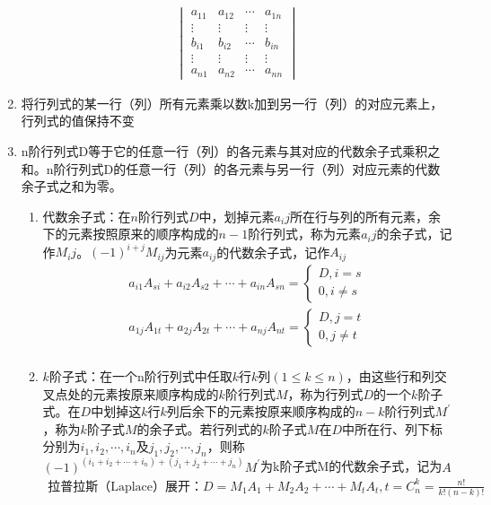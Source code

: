 \documentclass[12pt]{book}
\begin{document}
\begin{enumerate}[1.]
\begin{gather*}
\begin{vmatrix}
                  a_{11} & a_{12} & \cdots & a_{1n} \\
                  \vdots & \vdots & \vdots & \vdots \\
                  b_{i1} & b_{i2} & \cdots & b_{in} \\
                  \vdots & \vdots & \vdots & \vdots \\
                  a_{n1} & a_{n2} & \cdots & a_{nn}
              \end{vmatrix}
          \end{gather*}
    \item 将行列式的某一行（列）所有元素乘以数k加到另一行（列）的对应元素上，行列式的值保持不变
    \item n阶行列式D等于它的任意一行（列）的各元素与其对应的代数余子式乘积之和。n阶行列式D的任意一行（列）的各元素与另一行（列）对应元素的代数余子式之和为零。
    \begin{enumerate}[(1)]
        \item 代数余子式：在$n$阶行列式$D$中，划掉元素$a_ij$所在行与列的所有元素，余下的元素按照原来的顺序构成的$n-1$阶行列式，称为元素$a_ij$的余子式，记作$M_ij$。$(-1)^{i+j}M_{ij}$为元素$a_{ij}$的代数余子式，记作$A_{ij}$
        \begin{gather*}
            a_{i1}A_{si}+a_{i2}A_{s2}+\cdots+a_{in}A_{sn} = \begin{cases}
                D, i=s\\
                0, i\neq s
            \end{cases}\\
            a_{1j}A_{1t}+a_{2j}A_{2t}+\cdots+a_{nj}A_{nt} = \begin{cases}
                D, j=t\\
                0, j\neq t
            \end{cases}\\
        \end{gather*}
        \item $k$阶子式：在一个n阶行列式中任取$k$行$k$列$(1\leqslant k\leqslant n)$，由这些行和列交叉点处的元素按原来顺序构成的$k$阶行列式$M$，称为行列式$D$的一个$k$阶子式。在$D$中划掉这$k$行$k$列后余下的元素按原来顺序构成的$n-k$阶行列式$M^\prime$，称为$k$阶子式$M$的余子式。若行列式的$k$阶子式$M$在$D$中所在行、列下标分别为$i_1,i_2,\cdots,i_n$及$j_1,j_2,\cdots,j_n$，则称$(-1)^{(i_1+i_2+\cdots+i_n)+(j_1+j_2+\cdots+j_n)}M^\prime$为k阶子式M的代数余子式，记为$A$
        \begin{gather*}
            \text{拉普拉斯（Laplace）展开：}
            D=M_{1}A_{1}+M_{2}A_{2}+\cdots+M_{t}A_{t}, 
            t=C^k_n = \frac{n!}{k!(n-k)!} 
        \end{gather*}
    \end{enumerate}
\end{enumerate}
\end{document}
